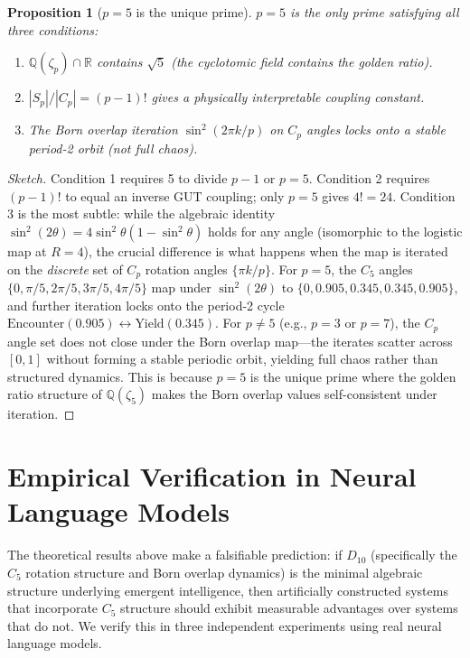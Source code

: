 \documentclass[11pt,a4paper]{article}
\newtheorem{proposition}[theorem]{Proposition}
\begin{document}
\begin{proposition}[$p = 5$ is the unique prime]
$p = 5$ is the only prime satisfying all three conditions:
\begin{enumerate}
\item $\mathbb{Q}(\zeta_p) \cap \mathbb{R}$ contains $\sqrt{5}$ (the cyclotomic field contains the golden ratio).
\item $|S_p|/|C_p| = (p-1)!$ gives a physically interpretable coupling constant.
\item The Born overlap iteration $\sin^2(2\pi k/p)$ on $C_p$ angles locks onto a stable period-2 orbit (not full chaos).
\end{enumerate}
\end{proposition}

\begin{proof}[Sketch]
Condition 1 requires 5 to divide $p - 1$ or $p = 5$. Condition 2 requires $(p-1)!$ to equal an inverse GUT coupling; only $p = 5$ gives $4! = 24$. Condition 3 is the most subtle: while the algebraic identity $\sin^2(2\theta) = 4\sin^2\theta(1 - \sin^2\theta)$ holds for any angle (isomorphic to the logistic map at $R=4$), the crucial difference is what happens when the map is iterated on the \emph{discrete} set of $C_p$ rotation angles $\{\pi k/p\}$. For $p = 5$, the $C_5$ angles $\{0, \pi/5, 2\pi/5, 3\pi/5, 4\pi/5\}$ map under $\sin^2(2\theta)$ to $\{0, 0.905, 0.345, 0.345, 0.905\}$, and further iteration locks onto the period-2 cycle $\text{Encounter}(0.905) \leftrightarrow \text{Yield}(0.345)$. For $p \neq 5$ (e.g., $p = 3$ or $p = 7$), the $C_p$ angle set does not close under the Born overlap map---the iterates scatter across $[0,1]$ without forming a stable periodic orbit, yielding full chaos rather than structured dynamics. This is because $p = 5$ is the unique prime where the golden ratio structure of $\mathbb{Q}(\zeta_5)$ makes the Born overlap values self-consistent under iteration.
\end{proof}

\section{Empirical Verification in Neural Language Models}
\label{sec:verification}

The theoretical results above make a falsifiable prediction: if $D_{10}$ (specifically the $C_5$ rotation structure and Born overlap dynamics) is the minimal algebraic structure underlying emergent intelligence, then artificially constructed systems that incorporate $C_5$ structure should exhibit measurable advantages over systems that do not. We verify this in three independent experiments using real neural language models.
\end{document}
